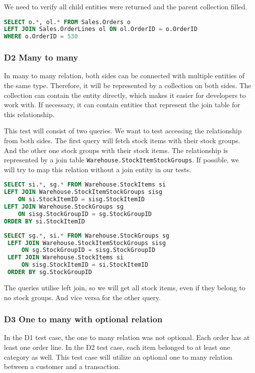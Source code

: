 We need to verify all child entities were returned and the parent collection filled. 



\begin{lstlisting}[language=SQL]
SELECT o.*, ol.* FROM Sales.Orders o
LEFT JOIN Sales.OrderLines ol ON ol.OrderID = o.OrderID
WHERE o.OrderID = 530
\end{lstlisting}

\subsubsection*{D2 Many to many}
In many to many relation, both sides can be connected with multiple entities of the same type. Therefore, it will be represented by a collection on both sides. The collection can contain the entity directly, which makes it easier for developers to work with. If necessary, it can contain entities that represent the join table for this relationship.

This test will consist of two queries. We want to test accessing the relationship from both sides. The first query will fetch stock items with their stock groups. And the other one stock groups with their stock items.
The relationship is represented by a join table \texttt{Warehouse.StockItemStockGroups}. If possible, we will try to map this relation without a join entity in our tests.

\begin{lstlisting}[language=SQL]
SELECT si.*, sg.* FROM Warehouse.StockItems si
LEFT JOIN Warehouse.StockItemStockGroups sisg
    ON si.StockItemID = sisg.StockItemID
LEFT JOIN Warehouse.StockGroups sg
    ON sisg.StockGroupID = sg.StockGroupID
ORDER BY si.StockItemID
\end{lstlisting}
\begin{lstlisting}[language=SQL]
 SELECT sg.*, si.* FROM Warehouse.StockGroups sg
 LEFT JOIN Warehouse.StockItemStockGroups sisg
     ON sg.StockGroupID = sisg.StockGroupID
 LEFT JOIN Warehouse.StockItems si
     ON sisg.StockItemID = si.StockItemID
 ORDER BY sg.StockGroupID
\end{lstlisting}
The queries utilise left join, so we will get all stock items, even if they belong to no stock groups. And vice versa for the other query.

\subsubsection*{D3 One to many with optional relation}
In the D1 test case, the one to many relation was not optional. Each order has at least one order line. In the D2 test case, each item belonged to at least one category as well.
This test case will utilize an optional one to many relation between a customer and a transaction. 

